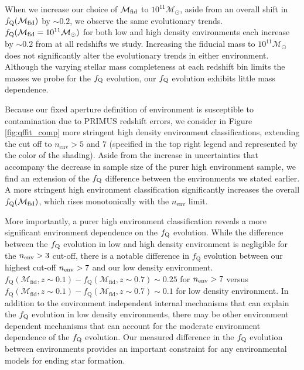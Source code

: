 \documentclass{emulateapj}
\begin{document}
When we increase our choice of $\mathcal{M}_{\rm{fid}}$ to $10^{11}
\mathcal{M}_\odot$, aside from an overall shift in
$f_{\rm{Q}}(\mathcal{M}_{\rm{fid}})$ by $\sim 0.2$, we observe the
same evolutionary trends. $f_{\rm{Q}}(\mathcal{M}_{\rm{fid}} =
10^{11}\mathcal{M}_{\odot})$ for both low and high density
environments each increase by $\sim 0.2$ from at all redshifts we
study. Increasing the fiducial mass to $10^{11}
\mathcal{M}_{\odot}$ does not significantly alter the evolutionary
trends in either environment. Although the varying stellar mass
completeness at each redshift bin limits the masses we probe for the
$f_{\rm{Q}}$ evolution, our $f_{\rm{Q}}$ evolution exhibits little
mass dependence.

Because our fixed aperture definition of environment is susceptible to
contamination due to PRIMUS redshift errors, we consider in Figure
\ref{fig:qffit_comp} more stringent high density environment
classifications, extending the cut off to $n_{\mathrm{env}} > 5$ and
$7$ (specified in the top right legend and represented by the color of
the shading). Aside from the increase in uncertainties that accompany
the decrease in sample size of the purer high environment sample, we
find an extension of the $f_{\rm{Q}}$ difference between the
environments we stated earlier. A more stringent high environment
classification significantly increases the overall
$f_{\rm{Q}}(\mathcal{M}_{\rm{fid}})$, which rises monotonically with
the $n_{\mathrm{env}}$ limit.

More importantly, a purer high environment classification reveals a
more significant environment dependence on the $f_{\rm{Q}}$
evolution. While the difference between the $f_{\rm{Q}}$ evolution in
low and high density environment is negligible for the $n_{\rm{env}} >
3$ cut-off, there is a notable difference in $f_{\mathrm{Q}}$
evolution between our highest cut-off $n_{\rm{env}} > 7$ and our low
density environment. $f_{\mathrm{Q}}(\mathcal{M}_{\mathrm{fid}}, z
\sim 0.1) - f_{\mathrm{Q}}(\mathcal{M}_{\mathrm{fid}}, z \sim 0.7)
\sim 0.25$ for $n_{\rm{env}} > 7$ versus
$f_{\mathrm{Q}}(\mathcal{M}_{\mathrm{fid}}, z \sim 0.1) -
f_{\mathrm{Q}}(\mathcal{M}_{\mathrm{fid}}, z \sim 0.7) \sim 0.1$ for
low density environment. In addition to the
environment independent internal mechanisms that can explain the
$f_{\rm{Q}}$ evolution in low density environments, there may be other
environment dependent mechanisms that can account for the moderate
environment dependence of the $f_{\rm{Q}}$ evolution. Our measured
difference in the $f_{\rm{Q}}$ evolution between environments provides
an important constraint for any environmental models for ending star
formation.
\end{document}
